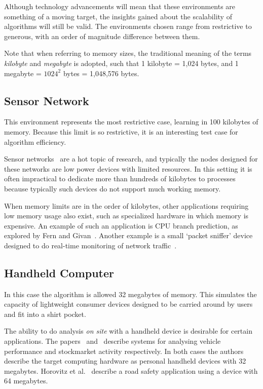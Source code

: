 Although technology advancements will mean that these environments are something of a moving target, the insights gained about the scalability of algorithms will still be valid. The environments chosen range from restrictive to generous, with an order of magnitude difference between them.

Note that when referring to memory sizes, the traditional meaning of the terms {\em kilobyte} and {\em megabyte} is adopted, such that 1 kilobyte = 1,024 bytes, and 1 megabyte = $1024^2$ bytes = 1,048,576 bytes.

\subsection{Sensor Network}
\label{sec:sensor}

This environment represents the most restrictive case, learning in 100 kilobytes of memory. Because this limit is so restrictive, it is an interesting test case for algorithm efficiency.

Sensor networks~\cite{sensornetworks, sensornetworksbook} are a hot topic of research, and typically the nodes designed for these networks are low power devices with limited resources. In this setting it is often impractical to dedicate more than hundreds of kilobytes to processes because typically such devices do not support much working memory.

When memory limits are in the order of kilobytes, other applications requiring low memory usage also exist, such as specialized hardware in which memory is expensive. An example of such an application is CPU branch prediction, as explored by Fern and Givan~\cite{branchpred}. Another example is a small `packet sniffer' device designed to do real-time monitoring of network traffic~\cite{packetsniff}.

\subsection{Handheld Computer}
\label{sec:handheld}

In this case the algorithm is allowed 32 megabytes of memory. This simulates the capacity of lightweight consumer devices designed to be carried around by users and fit into a shirt pocket.

The ability to do analysis {\em on site} with a handheld device is desirable for certain applications. The papers~\cite{vehicle} and~\cite{stockmarket} describe systems for analysing vehicle performance and stockmarket activity respectively. In both cases the authors describe the target computing hardware as personal handheld devices with 32 megabytes. Horovitz et al.~\cite{gaberroadsafety} describe a road safety application using a device with 64 megabytes.

